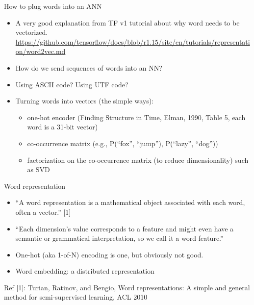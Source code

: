 \documentclass[11pt,handout]{beamer}
\begin{document}
\begin{frame}{How to plug words into an ANN}
 \begin{itemize}[<+->]
  \item A very good explanation from TF v1 tutorial about why word needs to be vectorized.
  \url{https://github.com/tensorflow/docs/blob/r1.15/site/en/tutorials/representation/word2vec.md}
  \item How do we send sequences of words into an NN? 
  \item Using ASCII code? Using UTF code? 
  \item Turning words into vectors (the simple ways):
  \begin{itemize}
   \item one-hot encoder (Finding Structure in Time, Elman, 1990, Table 5, each word is a 31-bit vector)
   \item co-occurrence matrix (e.g., P(``fox'', ``jump''), P(``lazy'', ``dog''))
   \item factorization on the co-occurrence matrix (to reduce dimensionality) such as SVD
  \end{itemize}
 \end{itemize}
\end{frame}

\begin{frame}{Word representation}
\begin{itemize}
 \item ``A word representation is a mathematical object
         associated with each word, often a vector.'' [1]
 \item ``Each dimension's value corresponds to a feature and
         might even have a semantic or grammatical
         interpretation, so we call it a word feature.''
 \item One-hot (aka 1-of-N) encoding is one, but obviously not good. 
 \item Word embedding: a distributed representation 
\end{itemize}
Ref [1]: Turian, Ratinov, and Bengio, Word representations:
A simple and general method for semi-supervised learning, ACL 2010
\end{frame}
\end{document}
